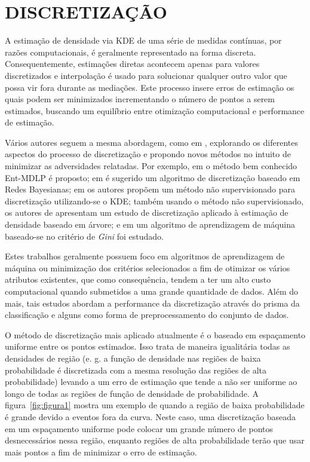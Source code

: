\chapter{DISCRETIZAÇÃO}
A estimação de densidade via \ac{KDE} de uma série de medidas contínuas, por razões computacionais, é geralmente representado na forma discreta. Consequentemente, estimações diretas acontecem apenas para valores discretizados \cite{jones1989discretized} e interpolação é usado para solucionar qualquer outro valor que possa vir fora durante as mediações. Este processo insere erros de estimação os quais podem ser minimizados incrementando o número de pontos a serem estimados, buscando um equilíbrio entre otimização computacional e performance de estimação.

Vários autores seguem a mesma abordagem, como em \cite{jones1989discretized}, explorando os diferentes aspectos do processo de discretização e propondo novos métodos no intuito de minimizar as adversidades relatadas. Por exemplo, em \cite{fayyad1993multi} o método bem conhecido Ent-MDLP é proposto; em \cite{friedman1996discretizing} é sugerido um algoritmo de discretização baseado em Redes Bayesianas; em \cite{biba2007unsupervised} os autores propõem um método não supervisionado para discretização utilizando-se o \ac{KDE}; também usando o método não supervisionado, os autores de \cite{schmidberger2005unsupervised} apresentam um estudo de discretização aplicado à estimação de densidade baseado em árvore; e em \cite{zhang2007discretization} um algoritmo de aprendizagem de máquina baseado-se no critério de \textit{Gini} foi estudado. 

Estes trabalhos geralmente possuem foco em algoritmos de aprendizagem de máquina ou minimização dos critérios selecionados a fim de otimizar os vários atributos existentes, que como consequência, tendem a ter um alto custo computacional quando submetidos a uma grande quantidade de dados. Além do mais, tais estudos abordam a performance da discretização através do prisma da classificação e alguns como forma de preprocessamento do conjunto de dados.

O método de discretização mais aplicado atualmente é o baseado em espaçamento uniforme entre os pontos estimados. Isso trata de maneira igualitária todas as densidades de região (e. g. a função de densidade nas regiões de baixa probabilidade é discretizada com a mesma resolução das regiões de alta probabilidade) levando a um erro de estimação que tende a não ser uniforme ao longo de todas as regiões de função de densidade de probabilidade.
A figura~\ref{fig:figura1} mostra um exemplo de quando a região de baixa probabilidade é grande devido a eventos fora da curva. Neste caso, uma discretização baseada em um espaçamento uniforme  pode colocar um grande número de pontos desnecessários nessa região, enquanto regiões de alta probabilidade terão que usar mais pontos a fim de minimizar o erro de estimação.

